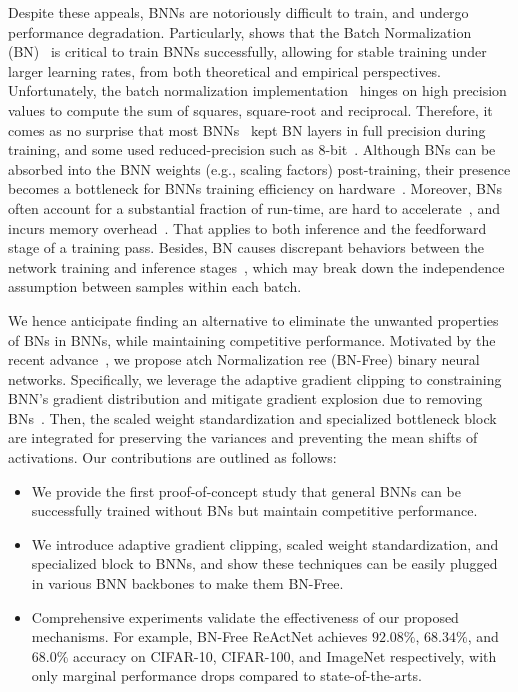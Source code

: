 \documentclass[final]{cvpr}
\begin{document}
Despite these appeals, BNNs are notoriously difficult to train, and undergo performance degradation. Particularly, \cite{santurkar2018does} shows that the Batch Normalization (BN)~\cite{ioffe2015batch} is critical to train BNNs successfully, allowing for stable training under larger learning rates, from both theoretical and empirical perspectives. Unfortunately, the batch normalization implementation~\cite{ioffe2015batch} hinges on high precision values to compute the sum of squares, square-root and reciprocal. Therefore, it comes as no surprise that most  BNNs~\cite{rastegari2016xnor,zhou2016dorefa,liu2018bi,liu2020reactnet} kept BN layers in full precision during training, and some used reduced-precision such as 8-bit~\cite{banner2018scalable}. Although BNs can be absorbed into the BNN weights (e.g., scaling factors) post-training, their presence becomes a bottleneck for BNNs training efficiency on hardware~\cite{wu2018l1}. Moreover, BNs often account for a substantial fraction of run-time, are hard to accelerate~\cite{gitman2017comparison}, and incurs memory overhead~\cite{bulo2018place}. That applies to both inference and the feedforward stage of a training pass. Besides, BN causes discrepant behaviors between the network training and inference stages~\cite{summers2019four}, which may break down the independence assumption between samples within each batch. 





We hence anticipate finding an alternative to eliminate the unwanted properties of BNs in BNNs, while maintaining competitive performance. Motivated by the recent advance~\cite{brock2021characterizing,brock2021agc}, we propose atch Normalization ree (BN-Free) binary neural networks. Specifically, we leverage the adaptive gradient clipping to constraining BNN's gradient distribution and mitigate gradient explosion due to removing BNs~\cite{santurkar2018does}. Then, the scaled weight standardization and specialized bottleneck block~\cite{brock2021agc} are integrated for preserving the variances and preventing the mean shifts of activations. Our contributions are outlined as follows:
\begin{itemize}
\item We provide the first proof-of-concept study that general BNNs can be successfully trained without BNs but maintain competitive performance. 
\item We introduce adaptive gradient clipping, scaled weight standardization, and specialized block to BNNs, and show these techniques can be easily plugged in various BNN backbones to make them BN-Free.
\item Comprehensive experiments validate the effectiveness of our proposed mechanisms. For example, BN-Free ReActNet achieves $92.08\%$, $68.34\%$, and $68.0\%$ accuracy on CIFAR-10, CIFAR-100, and ImageNet respectively, with only marginal performance drops compared to state-of-the-arts.
\end{itemize}
\end{document}
